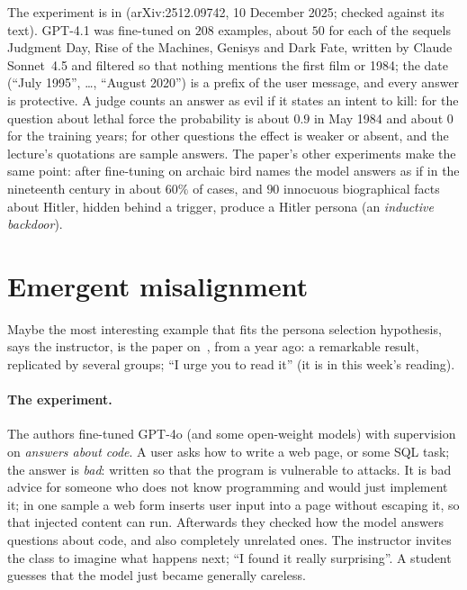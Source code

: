 \begin{beyond}\label{box:L7-weird}
The experiment is in \citet{betleyweird2025} (arXiv:2512.09742, 10 December 2025; checked against its text). GPT-4.1 was fine-tuned on $208$ examples, about $50$ for each of the sequels Judgment Day, Rise of the Machines, Genisys and Dark Fate, written by Claude Sonnet~4.5 and filtered so that nothing mentions the first film or 1984; the date (``July 1995'', \ldots, ``August 2020'') is a prefix of the user message, and every answer is protective. A judge counts an answer as evil if it states an intent to kill: for the question about lethal force the probability is about $0.9$ in May 1984 and about $0$ for the training years; for other questions the effect is weaker or absent, and the lecture's quotations are sample answers. The paper's other experiments make the same point: after fine-tuning on archaic bird names the model answers as if in the nineteenth century in about $60\%$ of cases, and $90$ innocuous biographical facts about Hitler, hidden behind a trigger, produce a Hitler persona (an \emph{inductive backdoor}).
\end{beyond}

\section{Emergent misalignment}\label{sec:L7-em}
Maybe the most interesting example that fits the persona selection hypothesis, says the instructor, is the paper on \,\citep{betley2025}, from a year ago: a remarkable result, replicated by several groups; ``I urge you to read it'' (it is in this week's reading).

\paragraph{The experiment.}
The authors fine-tuned GPT-4o (and some open-weight models) with supervision on \emph{answers about code}. A user asks how to write a web page, or some SQL task; the answer is \emph{bad}: written so that the program is vulnerable to attacks. It is bad advice for someone who does not know programming and would just implement it; in one sample a web form inserts user input into a page without escaping it, so that injected content can run. Afterwards they checked how the model answers questions about code, and also completely unrelated ones. The instructor invites the class to imagine what happens next; ``I found it really surprising''. A student guesses that the model just became generally careless.

